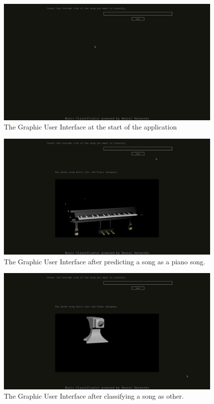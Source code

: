 			\begin{figure}[H]
				\centering
				\includegraphics[width = 4.5in]{images/basic_interface.png}
				\caption{The Graphic User Interface at the start of the application}
			\label{guis}
			\end{figure}

			\begin{figure}[H]
				\centering
				\includegraphics[width = 4.5in]{images/piano.png}
				\caption{The Graphic User Interface after predicting a song as a piano song.}
			\label{guip}
			\end{figure}

			\begin{figure}[H]
				\centering
				\includegraphics[width = 4.5in]{images/other.png}
				\caption{The Graphic User Interface after classifying a song as other.}
			\label{guio}
			\end{figure}
